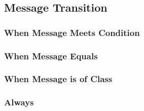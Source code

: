 \documentclass[11pt]{amsart}
\begin{document}
\subsection{Message Transition}
\subsubsection{When Message Meets Condition}
\subsubsection{When Message Equals}
\subsubsection{When Message is of Class}
\subsubsection{Always}
\end{document}
